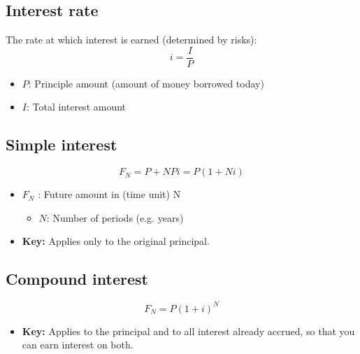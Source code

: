 \subsection{Interest rate}
\begin{definition}
    The rate at which interest is earned (determined by risks):
    \begin{equation}
        i = \frac{I}{P}
    \end{equation}
    \begin{itemize}
        \item \(P\): Principle amount (amount of money borrowed today)
        \item \(I\): Total interest amount 
    \end{itemize}
\end{definition}

\subsection{Simple interest}
\begin{definition}
    \begin{equation}
        F_N = P + NPi = P(1 + Ni)
    \end{equation}
    \begin{itemize}
        \item \(F_N\) : Future amount in (time unit) N
        \begin{itemize}
            \item \(N\): Number of periods (e.g. years)
        \end{itemize}
        \item \textbf{Key:} Applies only to the original principal.
    \end{itemize}
\end{definition}



\subsection{Compound interest}
\begin{definition}
    \begin{equation}
        F_N = P(1 + i)^N
    \end{equation}
    \begin{itemize}
        \item \textbf{Key:} Applies to the principal and to all interest already accrued, so that you can earn interest on both.
    \end{itemize}
\end{definition}

